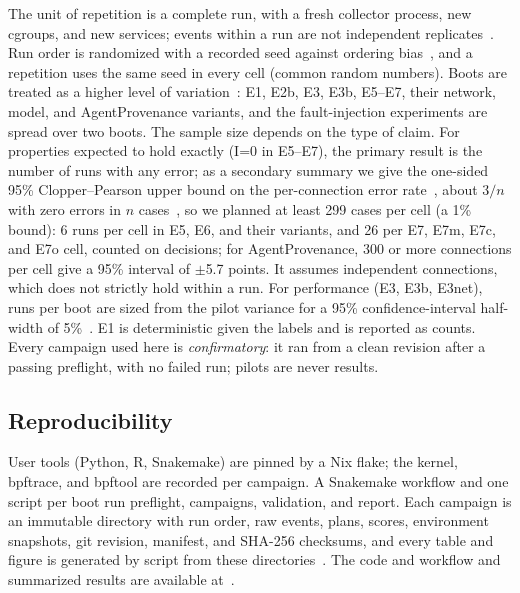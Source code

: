 The unit of repetition is a complete run, with a fresh collector process, new cgroups, and new services; events within a run are not independent replicates~\cite{georges2007statistically}. Run order is randomized with a recorded seed against ordering bias~\cite{mytkowicz2009producing}, and a repetition uses the same seed in every cell (common random numbers). Boots are treated as a higher level of variation~\cite{kalibera2013rigorous}: E1, E2b, E3, E3b, E5--E7, their network, model, and AgentProvenance variants, and the fault-injection experiments are spread over two boots. The sample size depends on the type of claim. For properties expected to hold exactly (I=0 in E5--E7), the primary result is the number of runs with any error; as a secondary summary we give the one-sided 95\% Clopper--Pearson upper bound on the per-connection error rate~\cite{clopper1934use}, about $3/n$ with zero errors in $n$ cases~\cite{hanley1983nothing}, so we planned at least 299 cases per cell (a 1\% bound): 6 runs per cell in E5, E6, and their variants, and 26 per E7, E7m, E7c, and E7o cell, counted on decisions; for AgentProvenance, 300 or more connections per cell give a 95\% interval of $\pm$5.7 points. It assumes independent connections, which does not strictly hold within a run. For performance (E3, E3b, E3net), runs per boot are sized from the pilot variance for a 95\% confidence-interval half-width of 5\%~\cite{hoefler2015scientific}. E1 is deterministic given the labels and is reported as counts. Every campaign used here is \emph{confirmatory}: it ran from a clean revision after a passing preflight, with no failed run; pilots are never results.

\subsection{Reproducibility}
\label{sec:repro}

User tools (Python, R, Snakemake) are pinned by a Nix flake; the kernel, bpftrace, and bpftool are recorded per campaign. A Snakemake workflow and one script per boot run preflight, campaigns, validation, and report. Each campaign is an immutable directory with run order, raw events, plans, scores, environment snapshots, git revision, manifest, and SHA-256 checksums, and every table and figure is generated by script from these directories~\cite{bajpai2019dagstuhl,collberg2016repeatability}.
The code and workflow and summarized results are available at~\cite{sourceCode}.

